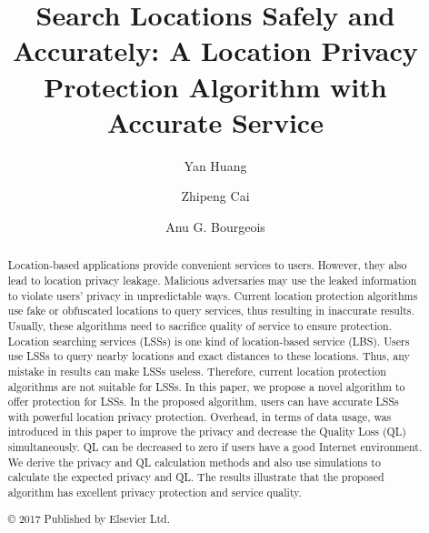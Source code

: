 \documentclass[a4paper,fleqn]{cas-dc}
\begin{document}
\let\WriteBookmarks\relax
\def\floatpagepagefraction{1}
\def\textpagefraction{.001}



\title [mode = title]{Search Locations Safely and Accurately: A Location Privacy Protection
Algorithm with Accurate Service}                      


\author{Yan Huang}

\author{Zhipeng Cai}

\author{Anu G. Bourgeois}



\begin{abstract}
Location-based applications provide convenient services to users. However, they also lead to location privacy leakage. Malicious adversaries may use the leaked information to violate users' privacy in unpredictable ways. Current location protection algorithms use fake or obfuscated locations to query services, thus resulting in inaccurate results. Usually, these algorithms need to sacrifice quality of service to ensure protection. Location searching services (LSSs) is one kind of location-based service (LBS). Users use LSSs to query nearby locations and exact distances to these locations. Thus, any mistake in results can make LSSs useless. Therefore, current location protection algorithms are not suitable for LSSs. In this paper, we propose a novel algorithm to offer protection for LSSs. In the proposed algorithm, users can have accurate LSSs with powerful location privacy protection. Overhead, in terms of data usage, was introduced in this paper to improve the privacy and decrease the Quality Loss (QL) simultaneously. QL can be decreased to zero if users have a good Internet environment. We derive the privacy and QL calculation methods and also use simulations to calculate the expected privacy and QL. The results illustrate that the proposed algorithm has excellent privacy protection and service quality. \\

\begin{center}
    © 2017 Published by Elsevier Ltd.
\end{center}

\end{abstract}
\end{document}
